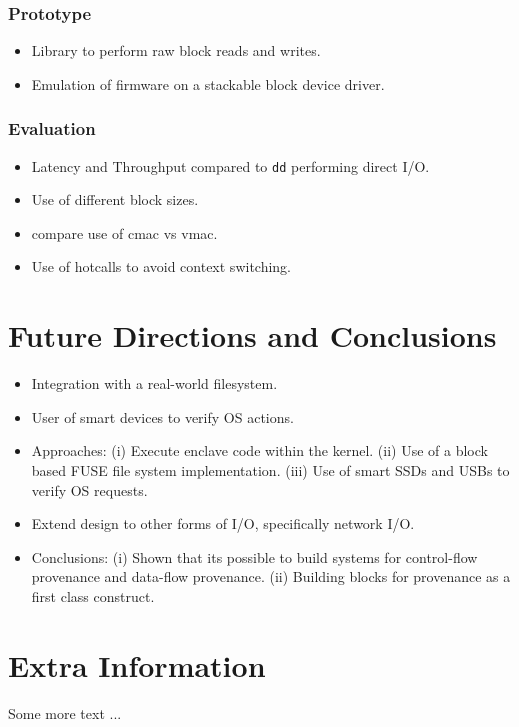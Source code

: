 \documentclass[withindex,glossary]{cam-thesis}
\begin{document}
\subsection{Prototype}
\begin{itemize}
\item Library to perform raw block reads and writes.
\item Emulation of firmware on a stackable block device driver.
\end{itemize}

\subsection{Evaluation}
\begin{itemize}
\item Latency and Throughput compared to \texttt{dd} performing direct I/O.
\item Use of different block sizes.
\item compare use of cmac vs vmac.
\item Use of hotcalls to avoid context switching.
\end{itemize}

\chapter{Future Directions and Conclusions}
\begin{itemize}
\item Integration with a real-world filesystem.
\item User of smart devices to verify OS actions.
\item Approaches:
(i) Execute enclave code within the kernel.
(ii) Use of a block based FUSE file system implementation.
(iii) Use of smart SSDs and USBs to verify OS requests.
\item Extend design to other forms of I/O, specifically network I/O.

\item Conclusions: 
(i) Shown that its possible to build systems for control-flow provenance and data-flow provenance.
(ii) Building blocks for provenance as a first class construct.
\end{itemize}




\cleardoublepage
{}
{}






\appendix

\chapter{Extra Information}
Some more text ...



\printthesisindex
\end{document}

